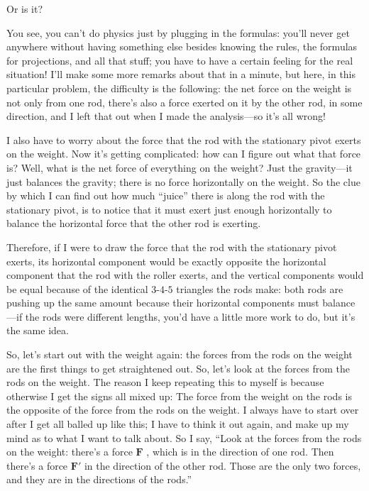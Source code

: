 \documentclass[11pt,oneside]{article}
\providecommand{\FLPF}{\mathbf{F}}
\begin{document}
Or is it?\par

You see, you can't do physics just by plugging in the formulas: you'll never get anywhere without having something else besides knowing the rules, the formulas for projections, and all that stuff; you have to have a certain feeling for the real situation! I'll make some more remarks about that in a minute, but here, in this particular problem, the difficulty is the following: the net force on the weight is not only from one rod, there's also a force exerted on it by the other rod, in some direction, and I left that out when I made the analysis---so it's all wrong!\par

I also have to worry about the force that the rod with the stationary pivot exerts on the weight. Now it's getting complicated: how can I figure out what that force is? Well, what is the net force of everything on the weight? Just the gravity---it just balances the gravity; there is no force horizontally on the weight. So the clue by which I can find out how much ``juice'' there is along the rod with the stationary pivot, is to notice that it must exert just enough horizontally to balance the horizontal force that the other rod is exerting.\par

Therefore, if I were to draw the force that the rod with the stationary pivot exerts, its horizontal component would be exactly opposite the horizontal component that the rod with the roller exerts, and the vertical components would be equal because of the identical \(\text{3-4-5}\) triangles the rods make: both rods are pushing up the same amount because their horizontal components must balance---if the rods were different lengths, you'd have a little more work to do, but it's the same idea.\par

So, let's start out with the weight again: the forces from the rods on the weight are the first things to get straightened out. So, let's look at the forces from the rods on the weight. The reason I keep repeating this to myself is because otherwise I get the signs all mixed up: The force from the weight on the rods is the opposite of the force from the rods on the weight. I always have to start over after I get all balled up like this; I have to think it out again, and make up my mind as to what I want to talk about. So I say, ``Look at the forces from the rods on the weight: there's a force \(\FLPF\) , which is in the direction of one rod. Then there's a force \(\FLPF'\) in the direction of the other rod. Those are the only two forces, and they are in the directions of the rods.''\par
\end{document}
